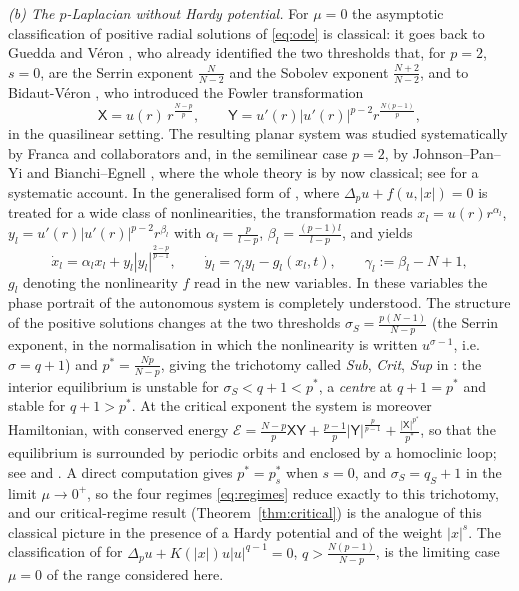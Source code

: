 \documentclass[11pt,reqno]{amsart}
\numberwithin{equation}{section}
\theoremstyle{plain}
\theoremstyle{definition}
\begin{document}
\smallskip
\noindent\emph{(b) The $p$-Laplacian without Hardy potential.} For $\mu=0$ the
asymptotic classification of positive radial solutions of \eqref{eq:ode} is
classical: it goes back to Guedda and V\'eron \cite{GueddaVeron}, who already
identified the two thresholds that, for $p=2$, $s=0$, are the Serrin exponent
$\frac{N}{N-2}$ and the Sobolev exponent $\frac{N+2}{N-2}$, and to
Bidaut-V\'eron \cite{BidautVeron1989,BV-V}, who introduced the Fowler
transformation
\begin{equation}\label{eq:fowlervars}
\mathsf X=u(r)\,r^{\frac{N-p}{p}},\qquad
\mathsf Y=u'(r)|u'(r)|^{p-2}r^{\frac{N(p-1)}{p}} ,
\end{equation}
in the quasilinear setting. The resulting planar system was studied
systematically by Franca and collaborators
\cite{Franca2004,Franca2008,Franca2009,FrancaJohnson} and, in the semilinear
case $p=2$, by Johnson--Pan--Yi \cite{JPY} and
Bianchi--Egnell \cite{BianchiEgnell}, where the whole theory is by now
classical; see \cite{QS} for a systematic account.
In the generalised form of \cite{Franca2008}, where $\Delta_{p}u+f(u,|x|)=0$ is
treated for a wide class of nonlinearities, the transformation reads
$x_{l}=u(r)r^{\alpha_{l}}$, $y_{l}=u'(r)|u'(r)|^{p-2}r^{\beta_{l}}$ with
$\alpha_{l}=\frac{p}{l-p}$, $\beta_{l}=\frac{(p-1)l}{l-p}$, and yields
\begin{equation}\label{eq:francasystem}
\dot x_{l}=\alpha_{l}x_{l}+y_{l}|y_{l}|^{\frac{2-p}{p-1}},
\qquad
\dot y_{l}=\gamma_{l}y_{l}-g_{l}(x_{l},t),
\qquad \gamma_{l}:=\beta_{l}-N+1 ,
\end{equation}
$g_{l}$ denoting the nonlinearity $f$ read in the new variables.
In these variables the phase portrait of the autonomous system is completely
understood. The structure of the positive solutions changes at the two
thresholds $\sigma_{S}=\frac{p(N-1)}{N-p}$ (the Serrin exponent, in the
normalisation in which the nonlinearity is written $u^{\sigma-1}$, i.e.\
$\sigma=q+1$) and
$p^{*}=\frac{Np}{N-p}$, giving the trichotomy called \emph{Sub}, \emph{Crit},
\emph{Sup} in \cite[\S1]{Franca2008}: the interior equilibrium is unstable for
$\sigma_{S}<q+1<p^{*}$, a \emph{centre} at $q+1=p^{*}$ and stable for
$q+1>p^{*}$.
At the critical exponent the system is moreover Hamiltonian, with conserved
energy
$\mathcal E=\frac{N-p}{p}\mathsf X\mathsf Y
+\frac{p-1}{p}|\mathsf Y|^{\frac{p}{p-1}}
+\frac{|\mathsf X|^{p^{*}}}{p^{*}}$,
so that the equilibrium is surrounded by periodic orbits and enclosed by a
homoclinic loop; see \cite[Fig.~1]{FrancaSfecci} and \cite[\S2]{DFS2026}. A direct
computation gives $p^{*}=p^{*}_{s}$ when $s=0$, and $\sigma_{S}=q_{S}+1$ in the
limit $\mu\to0^{+}$, so the four regimes \eqref{eq:regimes} reduce exactly to this
trichotomy, and our critical-regime result (Theorem~\ref{thm:critical}) is the
analogue of this classical picture in the presence of a Hardy potential and of
the weight $|x|^{s}$. The classification of \cite{Franca2004} for
$\Delta_{p}u+K(|x|)u|u|^{q-1}=0$, $q>\frac{N(p-1)}{N-p}$, is the limiting case
$\mu=0$ of the range considered here.
\end{document}

